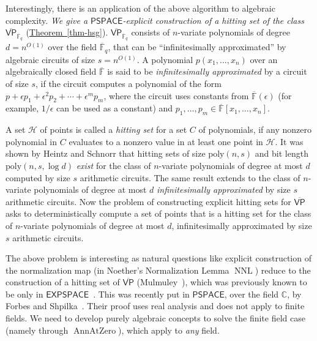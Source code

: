 \documentclass[11pt]{article}
\numberwithin{equation}{section}
\theoremstyle{definition}
\theoremstyle{plain}
\newcommand{\cclass}[1]{\textsf{#1}}
\newcommand{\expref}[2]{\hyperref[#2]{#1~\ref{#2}}}
\newcommand{\F}{\mathbb{F}}
\newcommand{\ol}[1]{\overline{#1}}
\newcommand{\PSPACE}{\cclass{PSPACE}\xspace}  %
\newcommand{\EXPSPACE}{\cclass{EXPSPACE}\xspace} %
\newcommand{\VP}{\cclass{VP}\xspace}  %
\newcommand{\VPbar}{\overline{\VP}\xspace}  %
\DeclareMathOperator{\AnnAtZero}{\mathrm{AnnAtZero}\xspace} %
\DeclareMathOperator{\NNL}{\mathrm{NNL}\xspace} %
\begin{document}
Interestingly, there is an
%
%
application of the above algorithm to algebraic complexity.  %
\emph{We give a $\PSPACE$-explicit construction of a
%
hitting set    %
of the class
%
$\VPbar_{\ol{\F}_q}$}    %
(\expref{Theorem}{thm-hsg}).
%
$\VPbar_{\ol{\F}_q}$    %
consists of $n$-variate
%
%
polynomials of degree $d=n^{O(1)}$ over
the field $\ol{\F}_q$, that can be ``infinitesimally approximated'' by
%
%
algebraic circuits of size $s=n^{O(1)}$.
A polynomial $p(x_1,\ldots,x_n)$ over an algebraically closed field $\ol{\F}$ is said to be \emph{infinitesimally approximated} by a circuit of size $s$, if the circuit computes a polynomial of the form $p+\epsilon p_1+\epsilon^2 p_2+\cdots+\epsilon^m p_m$, where the circuit uses constants from $\ol{\F}(\epsilon)$ (for example, ${1}/{\epsilon}$ can be used as a constant) and $p_1,\ldots,p_m \in \ol{\F}[x_1,\ldots,x_n]$.

%
A set $\mathcal{H}$ of points   %
is called a
%
\emph{hitting set}    %
for a
%
set $C$ of polynomials,   %
if any nonzero polynomial in $C$ evaluates to a nonzero value in at least one point in $\mathcal{H}$. 
It was shown by  %
Heintz and Schnorr   %
\cite{heintz1980testing} that
%
hitting sets  %
of size $\mathrm{poly}(n, s)$ and bit length $\mathrm{poly}(n, s,\log d)$
\emph{exist} for the class of $n$-variate polynomials of degree
at most $d$ computed by size $s$ arithmetic circuits.
The same result extends to  
the class of $n$-variate polynomials of degree at most $d$ \emph{infinitesimally approximated} by size $s$ arithmetic circuits. Now the
%
%
problem of constructing explicit hitting sets  %
for
%
$\VPbar$    %
asks to
%
%
%
deterministically compute a   %
%
set of points that is a hitting set for the class of $n$-variate polynomials of degree at most $d$, infinitesimally approximated by size $s$ arithmetic circuits.
%

The above problem is interesting as natural questions like explicit construction of the normalization map (in Noether's Normalization Lemma $\NNL$) reduce to the construction of a hitting set of
%
$\VPbar$    %
%
(Mulmuley~\cite{mulmuley2017geometric}), %
%
which was previously known to be only in
%
$\EXPSPACE$~\cite{mulmuley2017geometric,mul12}. 
This was recently put in $\PSPACE$, over the field $\mathbb{C}$,
by  %
Forbes and Shpilka~\cite{forbes2017pspace}.
Their proof
%
uses real analysis and does not apply to finite fields. We need to develop purely algebraic concepts to solve the finite field case (namely through $\AnnAtZero$), which apply to \emph{any} field.
%
%
%
%
\end{document}
